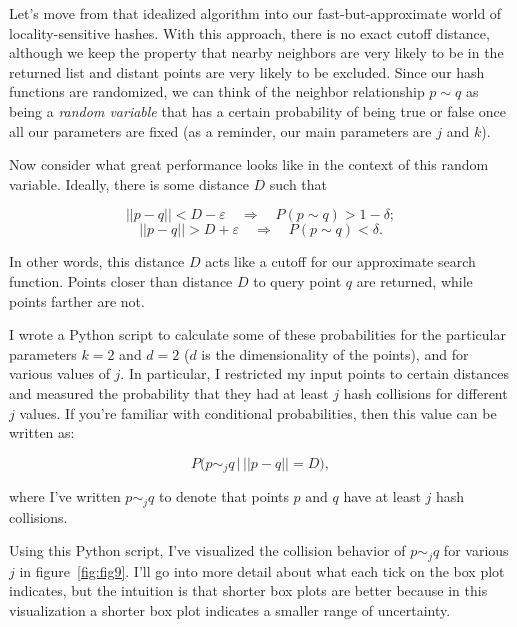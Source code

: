 \documentclass[20pt,]{extarticle}
\begin{document}
Let's move from that idealized algorithm into our fast-but-approximate
world of locality-sensitive hashes. With this approach, there is no
exact cutoff distance, although we keep the property that nearby
neighbors are very likely to be in the returned list and distant points
are very likely to be excluded. Since our hash functions are randomized,
we can think of the neighbor relationship \(p\sim q\) as being a
\emph{random variable} that has a certain probability of being true or
false once all our parameters are fixed (as a reminder, our main
parameters are \(j\) and \(k\)).

Now consider what great performance looks like in the context of this
random variable. Ideally, there is some distance \(D\) such that

\[||p-q|| < D-\varepsilon \quad\Rightarrow\quad P(p\sim q) > 1 - \delta;\]
\[||p-q|| > D+\varepsilon \quad\Rightarrow\quad P(p\sim q) < \delta.\]

In other words, this distance \(D\) acts like a cutoff for our
approximate search function. Points closer than distance \(D\) to query
point \(q\) are returned, while points farther are not.

I wrote a Python script to calculate some of these probabilities for the
particular parameters \(k=2\) and \(d=2\) (\(d\) is the dimensionality
of the points), and for various values of \(j\). In particular, I
restricted my input points to certain distances and measured the
probability that they had at least \(j\) hash collisions for different
\(j\) values. If you're familiar with conditional probabilities, then
this value can be written as:

\[ P\big(p \sim_j q \, \big| \, ||p-q|| = D\big), \]

where I've written \(p\sim_j q\) to denote that points \(p\) and \(q\)
have at least \(j\) hash collisions.

Using this Python script, I've visualized the collision behavior of
\(p\sim_j q\) for various \(j\) in figure~\ref{fig:fig9}. I'll go into
more detail about what each tick on the box plot indicates, but the
intuition is that shorter box plots are better because in this
visualization a shorter box plot indicates a smaller range of
uncertainty.
\end{document}
